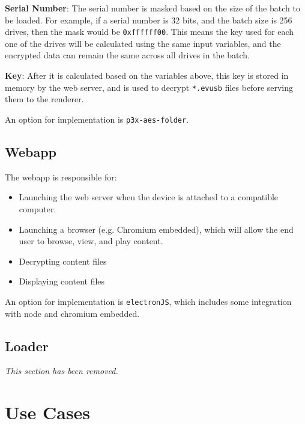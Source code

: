 \documentclass{article}
\begin{document}
{\bf Serial Number}: The serial number is masked based on the size of
the batch to be loaded.  For example, if a serial number is 32 bits,
and the batch size is 256 drives, then the mask would be \verb+0xffffff00+.
This means the key used for each one of the drives will be calculated
using the same input variables, and the encrypted data can remain
the same across all drives in the batch.

{\bf Key}: After it is calculated based on the variables above,
this key is stored in memory by the web server, and is used to decrypt
\verb+*.evusb+ files before serving them to the renderer.

An option for implementation is \verb+p3x-aes-folder+.

\subsection{Webapp}

The webapp is responsible for:
\begin{itemize}
\item Launching the web server when the device is attached to 
      a compatible computer.
\item Launching a browser (e.g. Chromium embedded), which will allow
      the end user to browse, view, and play content.
\item Decrypting content files
\item Displaying content files 
\end{itemize}

An option for implementation is \verb+electronJS+, which includes some 
integration with node and chromium embedded.

\subsection{Loader}

{\it This section has been removed.}

\section{Use Cases}
\end{document}
